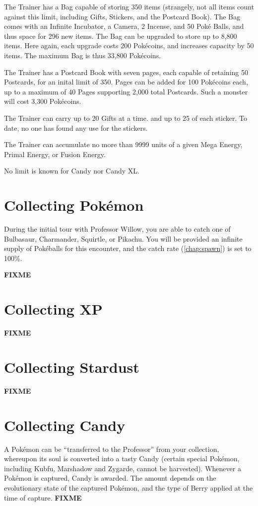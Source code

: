 The Trainer has a Bag capable of storing 350 items (strangely, not all items
  count against this limit, including Gifts, Stickers, and the Postcard Book).
The Bag comes with an Infinite Incubator, a Camera, 2 Incense, and 50 Poké Balls,
  and thus space for 296 new items.
The Bag can be upgraded to store up to 8,800 items.
Here again, each upgrade costs 200 Pokécoins, and increases capacity by 50 items.
The maximum Bag is thus 33,800 Pokécoins.

The Trainer has a Postcard Book with seven pages, each capable of retaining
 50 Postcards, for an inital limit of 350.
Pages can be added for 100 Pokécoins each, up to a maximum of 40 Pages
 supporting 2,000 total Postcards.
Such a monster will cost 3,300 Pokécoins.

The Trainer can carry up to 20 Gifts at a time. and up to 25 of each sticker.
To date, no one has found any use for the stickers.

The Trainer can accumulate no more than 9999 units of a given Mega Energy,
 Primal Energy, or Fusion Energy.

No limit is known for Candy nor Candy XL.

\section{Collecting Pokémon}
During the initial tour with Professor Willow, you are able to catch one of
 Bulbasaur, Charmander, Squirtle, or Pikachu.
You will be provided an infinite supply of Pokéballs for this encounter, and
 the catch rate (\autoref{chap:spawn}) is set to 100\%.

\textbf{FIXME}

\section{Collecting XP}
\textbf{FIXME}

\section{Collecting Stardust}
\textbf{FIXME}

\section{Collecting Candy}
A Pokémon can be ``transferred to the Professor'' from your collection,
 whereupon its soul is converted into a tasty Candy (certain special
 Pokémon, including Kubfu, Marshadow and Zygarde, cannot be harvested).
Whenever a Pokémon is captured, Candy is awarded. The amount depends on
 the evolutionary state of the captured Pokémon, and the type of Berry
 applied at the time of capture.
\textbf{FIXME}

